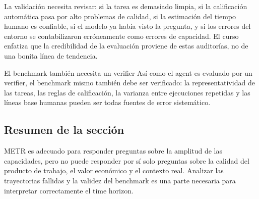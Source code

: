 La validación necesita revisar: si la tarea es demasiado limpia, si la calificación automática pasa por alto problemas de calidad, si la estimación del tiempo humano es confiable, si el modelo ya había visto la pregunta, y si los errores del entorno se contabilizaron erróneamente como errores de capacidad. El curso enfatiza que la credibilidad de la evaluación proviene de estas auditorías, no de una bonita línea de tendencia.

\begin{importantbox}{El benchmark también necesita un verifier}
Así como el agent es evaluado por un verifier, el benchmark mismo también debe ser verificado: la representatividad de las tareas, las reglas de calificación, la varianza entre ejecuciones repetidas y las líneas base humanas pueden ser todas fuentes de error sistemático.
\end{importantbox}

\subsection{Resumen de la sección}

METR es adecuado para responder preguntas sobre la amplitud de las capacidades, pero no puede responder por sí solo preguntas sobre la calidad del producto de trabajo, el valor económico y el contexto real. Analizar las trayectorias fallidas y la validez del benchmark es una parte necesaria para interpretar correctamente el time horizon.

